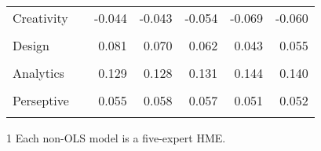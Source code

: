 \documentclass[12pt]{article}
\begin{document}
\begin{table}
\begin{threeparttable}
\begin{tabular}[l]{l l r r r r r}
      Creativity  &   & -0.044  & -0.043  & -0.054  & -0.069  & -0.060       \\
                  &   &   &   &   &   &        \\[0.3cm]
       
      Design      &   & 0.081  & 0.070  & 0.062  & 0.043  & 0.055       \\
                  &   &   &   &   &   &        \\[0.3cm]
        
      Analytics   &   & 0.129  & 0.128  & 0.131  & 0.144  & 0.140       \\
                  &   &   &   &   &   &        \\[0.3cm]
       
      Perseptive  &   & 0.055  & 0.058  & 0.057  & 0.051  & 0.052       \\
                  &   &   &   &   &   &        \\[0.3cm]


      \hline
    \end{tabular}
    \begin{tablenotes}
      \item[1]{\footnotesize Each non-OLS model is a five-expert HME.}
    \end{tablenotes} \label{tbl:model_marg_effects_2}
  \end{threeparttable}
\end{table}
\end{document}
